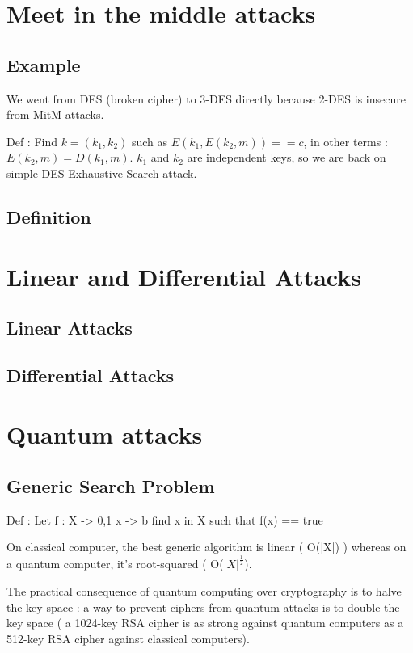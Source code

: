 \section{Meet in the middle attacks}

\subsection{Example}
We went from DES (broken cipher) to 3-DES directly because 2-DES is insecure from MitM attacks.

Def : Find $k = (k_1,k_2)$ such as $E(k_1,E(k_2,m)) == c$, in other terms : $E(k_2,m) = D(k_1,m) $.
$k_1$ and $k_2$ are independent keys, so we are back on simple DES Exhaustive Search attack.

\subsection{Definition}

\section{Linear and Differential Attacks}
\subsection{Linear Attacks}
\subsection{Differential Attacks}


\section{Quantum attacks}

\subsection{ Generic Search Problem}

Def : Let f : X -> {0,1}
              x ->   b
find x in X such that f(x) == true

On classical computer, the best generic algorithm is linear ( O(|X|) ) whereas on a quantum computer, it's root-squared ( O($|X|^{\frac{1}{2}}$).

The practical consequence of quantum computing over cryptography is to halve the key space : a way to prevent ciphers from quantum attacks is to double the key space ( a 1024-key RSA cipher is as strong against quantum computers as a 512-key RSA cipher against classical computers).


